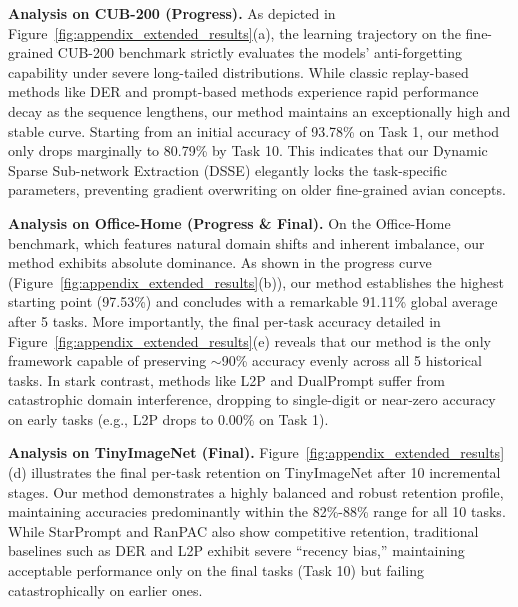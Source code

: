 \documentclass[journal]{IEEEtran}
\theoremstyle{plain}
\theoremstyle{definition}
\theoremstyle{remark}
\begin{document}
\textbf{Analysis on CUB-200 (Progress).} 
As depicted in Figure~\ref{fig:appendix_extended_results}(a), the learning trajectory on the fine-grained CUB-200 benchmark strictly evaluates the models' anti-forgetting capability under severe long-tailed distributions. While classic replay-based methods like DER and prompt-based methods experience rapid performance decay as the sequence lengthens, our method maintains an exceptionally high and stable curve. Starting from an initial accuracy of 93.78\% on Task 1, our method only drops marginally to 80.79\% by Task 10. This indicates that our Dynamic Sparse Sub-network Extraction (DSSE) elegantly locks the task-specific parameters, preventing gradient overwriting on older fine-grained avian concepts.

\textbf{Analysis on Office-Home (Progress \& Final).} 
On the Office-Home benchmark, which features natural domain shifts and inherent imbalance, our method exhibits absolute dominance. As shown in the progress curve (Figure~\ref{fig:appendix_extended_results}(b)), our method establishes the highest starting point (97.53\%) and concludes with a remarkable 91.11\% global average after 5 tasks. More importantly, the final per-task accuracy detailed in Figure~\ref{fig:appendix_extended_results}(e) reveals that our method is the only framework capable of preserving $\sim$90\% accuracy evenly across all 5 historical tasks. In stark contrast, methods like L2P and DualPrompt suffer from catastrophic domain interference, dropping to single-digit or near-zero accuracy on early tasks (e.g., L2P drops to 0.00\% on Task 1).

\textbf{Analysis on TinyImageNet (Final).} 
Figure~\ref{fig:appendix_extended_results}(d) illustrates the final per-task retention on TinyImageNet after 10 incremental stages. Our method demonstrates a highly balanced and robust retention profile, maintaining accuracies predominantly within the 82\%-88\% range for all 10 tasks. While StarPrompt and RanPAC also show competitive retention, traditional baselines such as DER and L2P exhibit severe ``recency bias,'' maintaining acceptable performance only on the final tasks (Task 10) but failing catastrophically on earlier ones.
\end{document}
